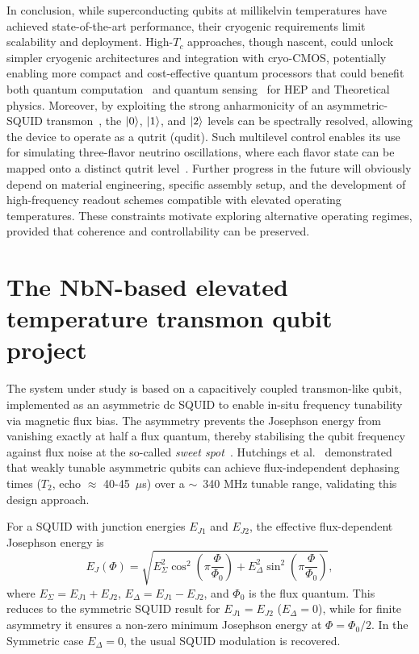 In conclusion, while superconducting qubits at millikelvin temperatures have achieved state-of-the-art performance, their cryogenic requirements limit scalability and deployment. High-$T_c$ approaches, though nascent, could unlock simpler cryogenic architectures and integration with cryo-CMOS, potentially enabling more compact and cost-effective quantum processors that could benefit both quantum computation~\cite{Lyu2024} and quantum sensing~\cite{Alesini2023} for HEP and Theoretical physics. Moreover, by exploiting the strong anharmonicity of an asymmetric-SQUID transmon~\cite{Bianchetti2010,Xu2016}, 
the $\ket{0}$, $\ket{1}$, and $\ket{2}$ levels can be spectrally resolved, 
allowing the device to operate as a qutrit (qudit). 
Such multilevel control enables its use for simulating three-flavor neutrino 
oscillations, where each flavor state can be mapped onto a distinct qutrit level~\cite{Goss2022,Nguyen2023,Turro2025}.
Further progress in the future will obviously depend on material engineering, specific assembly setup, and the development of high-frequency readout schemes compatible with elevated operating temperatures.
These constraints motivate exploring alternative operating regimes, provided that coherence and controllability can be preserved.

\section{The NbN-based elevated temperature transmon qubit project}
\label{sec:nbn_project_overview}

The system under study is based on a capacitively coupled transmon-like qubit, implemented as an asymmetric dc SQUID to enable in-situ frequency tunability via magnetic flux bias. 
The asymmetry prevents the Josephson energy from vanishing exactly at half a flux quantum, thereby stabilising the qubit frequency against flux noise at the so-called \emph{sweet spot}~\cite{Koch2007Transmon, nakamura2011epitaxialNbN}.
Hutchings et al.~\cite{Hutchings2017} demonstrated that weakly tunable asymmetric qubits can achieve flux-independent dephasing times ($T_2$, echo $\approx$ 40-45~$\mu$s) over a $\sim$~340 MHz tunable range, validating this design approach.

For a SQUID with junction energies $E_{J1}$ and $E_{J2}$, the effective flux-dependent Josephson energy is
\begin{equation}
E_{J}(\Phi) = \sqrt{E_{\Sigma}^2 \cos^2\!\left(\pi \frac{\Phi}{\Phi_0}\right) +
E_{\Delta}^2 \sin^2\!\left(\pi \frac{\Phi}{\Phi_0}\right)} ,
\label{eq:EJ_flux}
\end{equation}
where $E_{\Sigma} = E_{J1}+E_{J2}$, $E_{\Delta}=E_{J1}-E_{J2}$, and $\Phi_0$ is the flux quantum.  
This reduces to the symmetric SQUID result for $E_{J1}=E_{J2}$ ($E_\Delta = 0$), while for finite asymmetry it ensures a non-zero minimum Josephson energy at $\Phi=\Phi_0/2$. In the Symmetric case $E_\Delta = 0$, the usual SQUID modulation is recovered.


